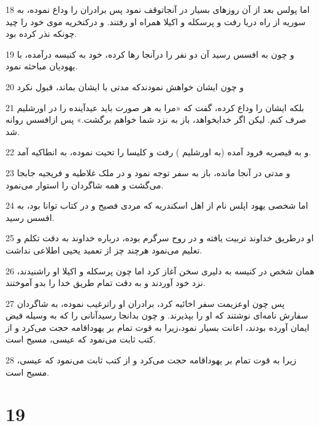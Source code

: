 \par 18 اما پولس بعد از آن روزهای بسیار در آنجاتوقف نمود پس برادران را وداع نموده، به سوریه از راه دریا رفت و پرسکله و اکیلا همراه او رفتند. و درکنخریه موی خود را چید چونکه نذر کرده بود.
\par 19 و چون به افسس رسید آن دو نفر را درآنجا رها کرده، خود به کنیسه درآمده، با یهودیان مباحثه نمود.
\par 20 و چون ایشان خواهش نمودندکه مدتی با ایشان بماند، قبول نکرد
\par 21 بلکه ایشان را وداع کرده، گفت که «مرا به هر صورت باید عیدآینده را در اورشلیم صرف کنم. لیکن اگر خدابخواهد، باز به نزد شما خواهم برگشت.» پس ازافسس روانه شد.
\par 22 و به قیصریه فرود آمده (به اورشلیم ) رفت و کلیسا را تحیت نموده، به انطاکیه آمد.
\par 23 و مدتی در آنجا مانده، باز به سفر توجه نمود و در ملک غلاطیه و فریجیه جابجا می‌گشت و همه شاگردان را استوار می‌نمود.
\par 24 اما شخصی یهود اپلس نام از اهل اسکندریه که مردی فصیح و در کتاب توانا بود، به افسس رسید.
\par 25 او درطریق خداوند تربیت یافته و در روح سرگرم بوده، درباره خداوند به دقت تکلم و تعلیم می‌نمود هر‌چند چز از تعمید یحیی اطلاعی نداشت.
\par 26 همان شخص در کنیسه به دلیری سخن آغاز کرد اما چون پرسکله و اکیلا او راشنیدند، نزد خود آوردند و به دقت تمام طریق خدا را بدو آموختند.
\par 27 پس چون اوعزیمت سفر اخائیه کرد، برادران او راترغیب نموده، به شاگردان سفارش نامه‌ای نوشتند که او را بپذیرند. و چون بدانجا رسیدآنانی را که به وسیله فیض ایمان آورده بودند، اعانت بسیار نمود،زیرا به قوت تمام بر یهوداقامه حجت می‌کرد و از کتب ثابت می‌نمود که عیسی، مسیح است.
\par 28 زیرا به قوت تمام بر یهوداقامه حجت می‌کرد و از کتب ثابت می‌نمود که عیسی، مسیح است.

\chapter{19}

